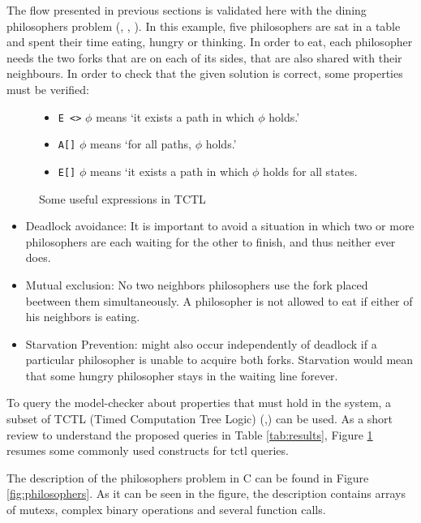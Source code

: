 \documentclass[conference]{IEEEtran}
\begin{document}
The flow presented in previous sections is validated here with the dining philosophers problem (\cite{philo_1}, \cite{philo_2}, \cite{philo_3}). In this example, five philosophers are sat in a table and spent their time eating, hungry or thinking. In order to eat, each philosopher needs the two forks that are on each of its sides, that are also shared with their neighbours. In order to check that the given solution is correct, some properties must be verified:

\begin{figure}[t!]
    \centering
    \begin{itemize}
        \item \verb+E <>+ $\phi$ means `it exists a path in which $\phi$ holds.'
        \item \verb+A[]+ $\phi$ means `for all paths, $\phi$ holds.'
        \item \verb+E[]+ $\phi$ means `it exists a path in which $\phi$ holds for all states.
    \end{itemize}
    \caption{Some useful expressions in TCTL}
    \label{fig:tctl}
\end{figure}




\begin{itemize}
    \item Deadlock avoidance: It is important to avoid a situation in which two or more philosophers are each waiting for the other to finish, and thus neither ever does.
    \item Mutual exclusion: No two neighbors philosophers use the fork placed beetween them simultaneously. A philosopher is not allowed to eat if either of his neighbors is eating.
    \item Starvation Prevention: might also occur independently of deadlock if a particular philosopher is unable to acquire both forks.  Starvation would mean that some hungry philosopher stays in the waiting line forever.
\end{itemize}

To query the model-checker about properties that must hold in the system, a subset of TCTL (Timed Computation Tree Logic) (\cite{tctl_1},\cite{tctl_2}) can be used. As a short review to understand the proposed queries in Table \ref{tab:results}, Figure \ref{fig:tctl} resumes some commonly used constructs for tctl queries.






The description of the philosophers problem in C can be found in Figure \ref{fig:philosophers}. As it can be seen in the figure, the description contains arrays of mutexs, complex binary operations and several function calls.
\end{document}
